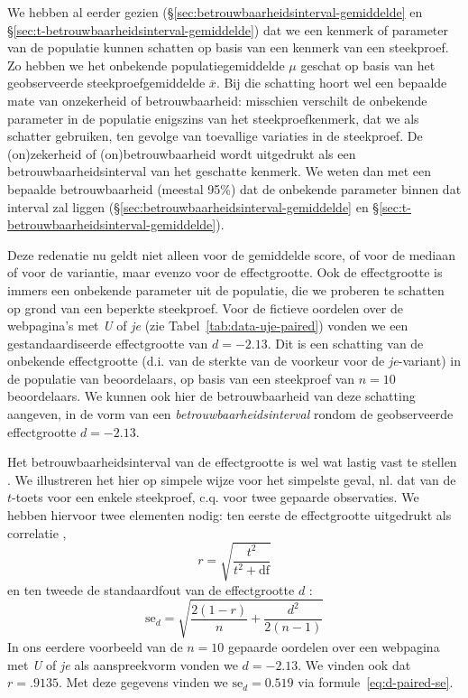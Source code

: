 \documentclass[
]{book}
\begin{document}
We hebben al eerder gezien
(§\ref{sec:betrouwbaarheidsinterval-gemiddelde} en §\ref{sec:t-betrouwbaarheidsinterval-gemiddelde})
dat we een kenmerk
of parameter van de populatie kunnen schatten op basis van een kenmerk
van een steekproef. Zo hebben we het onbekende populatiegemiddelde \(\mu\)
geschat op basis van het geobserveerde steekproefgemiddelde
\(\overline{x}\). Bij die schatting hoort wel een bepaalde mate van
onzekerheid of betrouwbaarheid: misschien verschilt de onbekende
parameter in de populatie enigszins van het steekproefkenmerk, dat we
als schatter gebruiken, ten gevolge van toevallige variaties in de
steekproef. De (on)zekerheid of (on)betrouwbaarheid wordt uitgedrukt als
een betrouwbaarheidsinterval van het geschatte kenmerk. We weten dan met
een bepaalde betrouwbaarheid (meestal 95\%) dat de onbekende parameter
binnen dat interval zal liggen
(§\ref{sec:betrouwbaarheidsinterval-gemiddelde} en §\ref{sec:t-betrouwbaarheidsinterval-gemiddelde}).

Deze redenatie nu geldt niet alleen voor de gemiddelde score, of voor de
mediaan of voor de variantie, maar evenzo voor de effectgrootte. Ook de
effectgrootte is immers een onbekende parameter uit de populatie, die we
proberen te schatten op grond van een beperkte steekproef. Voor de
fictieve oordelen over de webpagina's met \emph{U} of \emph{je} (zie
Tabel~\ref{tab:data-uje-paired}) vonden we een gestandaardiseerde
effectgrootte van \(d=-2.13\). Dit is een schatting van de onbekende
effectgrootte (d.i. van de sterkte van de voorkeur voor de \emph{je}-variant)
in de populatie van beoordelaars, op basis van een steekproef van \(n=10\)
beoordelaars. We kunnen ook hier de betrouwbaarheid van deze schatting
aangeven, in de vorm van een \emph{betrouwbaarheidsinterval} rondom de
geobserveerde effectgrootte \(d=-2.13\).

Het betrouwbaarheidsinterval van de effectgrootte is wel wat lastig vast
te stellen \citep{Naka07, Chen15}. We illustreren het hier op simpele wijze
voor het simpelste geval, nl. dat van de \(t\)-toets voor een enkele steekproef,
c.q. voor twee gepaarde observaties. We hebben hiervoor twee elementen
nodig: ten eerste de effectgrootte uitgedrukt als correlatie \citep[ p.359, formule 12.1]{Rose08}, \[r = \sqrt{ \frac{t^2}{t^2+\textrm{df}} }\] en
ten tweede de standaardfout van de effectgrootte \(d\) \citep[ p.600,
formule 18]{Naka07}:
\begin{equation}
  \label{eq:d-paired-se}
    \textrm{se}_d = \sqrt{ \frac{2(1-r)}{n} + \frac{d^2}{2(n-1)} }
\end{equation}
In
ons eerdere voorbeeld van de \(n=10\) gepaarde oordelen over een webpagina
met \emph{U} of \emph{je} als aanspreekvorm vonden we \(d=-2.13\). We vinden ook dat
\(r=.9135\). Met deze gegevens vinden we \(\textrm{se}_d = 0.519\) via
formule~\eqref{eq:d-paired-se}.
\end{document}
